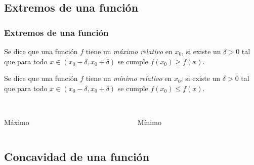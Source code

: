 	\subsection{Extremos de una función}
	\begin{frame}
		\frametitle{Extremos de una función}
		\begin{definicion}
			Se dice que una función $f$ tiene un \emph{máximo relativo} en $x_0$, si existe un $\delta>0$ tal que para todo $x\in
			(x_0-\delta,x_0+\delta)$ se cumple $f(x_0)\geq f(x)$.
			
			Se dice que una función $f$ tiene un \emph{mínimo relativo} en $x_0$, si existe un $\delta>0$ tal que para todo $x\in
			(x_0-\delta,x_0+\delta)$ se cumple $f(x_0)\leq f(x)$.
		\end{definicion}
		
		\begin{columns}
			\begin{column}{0.4\textwidth}
				\begin{center}
					\scalebox{1}{}\\
					\color{red}Máximo
				\end{center}
			\end{column}
			\begin{column}{0.4\textwidth}
				\begin{center}
					\scalebox{1}{}\\
					\color{red}Mínimo
				\end{center}
			\end{column}
		\end{columns}
	\end{frame} 
	
	
	\subsection{Concavidad de una función}
	
